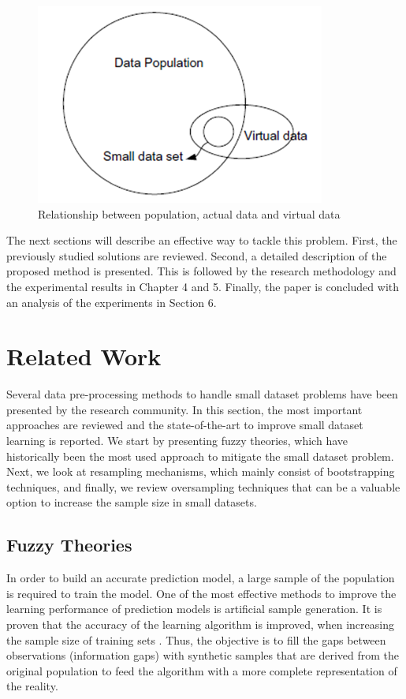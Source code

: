 \documentclass[parskip=full]{scrartcl}
\begin{document}
\begin{figure}[H]
	\centering
	\includegraphics[width=0.35\linewidth]{./Resources/relationship}
	\caption{Relationship between population, actual data and virtual data \cite{Li.2006}}
	\label{fig:relationship}
\end{figure}

The next sections will describe an effective way to tackle this problem. First, 
the previously studied solutions are reviewed. Second, a detailed description 
of the proposed method is presented. This is followed by the research 
methodology and the experimental results in Chapter 4 and 5. Finally, the paper 
is concluded with an analysis of the experiments in Section 6.

\section{Related Work}
Several data pre-processing methods to handle small dataset problems have been
presented by the research community. In this section, the most important
approaches are reviewed and the state-of-the-art to improve small dataset
learning is reported. We start by presenting fuzzy theories, which have 
historically been the most used approach to mitigate the small dataset problem. 
Next, we look at resampling mechanisms, which mainly consist of bootstrapping 
techniques, and finally, we review oversampling techniques that can be a 
valuable option to increase the sample size in small datasets.

\subsection{Fuzzy Theories}

In order to build an accurate prediction model, a large sample of the 
population is required to train the model. One of the most effective methods to 
improve the learning performance of prediction models is artificial sample 
generation. It is proven that the accuracy of the learning algorithm is 
improved, when increasing the sample size of training sets 
\cite{AbdulLateh.2017}. Thus, the objective is to fill the gaps between 
observations (information gaps) with synthetic samples that are derived from 
the original population to feed the algorithm with a more complete 
representation of the reality.
\end{document}
